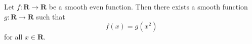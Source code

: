 Let $f: \mathbf{R} \to \mathbf{R}$ be a smooth even function. Then there exists a smooth function $g: \mathbf{R} \to \mathbf{R}$ such that
$$f(x) = g(x^2)$$
for all $x \in \mathbf{R}$.

